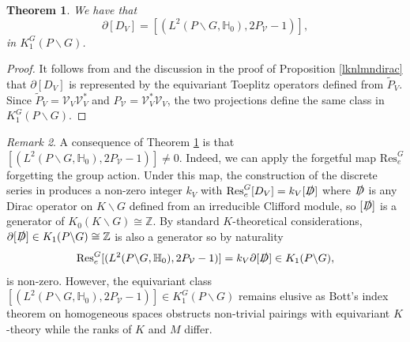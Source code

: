 \documentclass[a4paper,reqno]{amsart}
\numberwithin{equation}{section}
\def\Z{\mathbb{Z}}
\newtheorem{thm}{Theorem}[section]
\theoremstyle{definition}
\theoremstyle{remark}
\newtheorem{remark}[thm]{Remark}
\begin{document}
\begin{thm}
\label{lknlnadkhom}
We have that
$$\partial[D_V]=[(L^2(P\backslash G,\mathbb{H}_0),2P_{\mathcal{V}}-1)],$$
in $K_1^{G}(P\backslash G)$.
\end{thm}

\begin{proof}
It follows from \cite[Subsection 3.4]{fries} and the discussion in the proof of Proposition \ref{lknlmndirac} that $\partial[D_V]$ is represented by the equivariant Toeplitz operators defined from $\tilde{P}_V$. Since $\tilde{P}_V=\mathcal{V}_V\mathcal{V}_V^*$ and $P_{\mathcal{V}}=\mathcal{V}_V^*\mathcal{V}_V$, the two projections define the same class in $K_1^{G}(P\backslash G)$.
\end{proof}



\begin{remark}
A consequence of Theorem \ref{lknlnadkhom} is that $[(L^2(P\backslash G,\mathbb{H}_0),2P_{\mathcal{V}}-1)]\neq 0$. Indeed, we can apply the forgetful map $\mathrm{Res}^G_e$ forgetting the group action. Under this map, the construction of the discrete series in \cite{laffaicm} produces a non-zero integer $k_V$ with $\mathrm{Res}^G_e[D_V]=k_V[\slashed{D}]$ where $\slashed{D}$ is any Dirac operator on $K\backslash G$ defined from an irreducible Clifford module, so $[\slashed{D}]$ is a generator of $K_0(K\backslash G)\cong \Z$. By standard $K$-theoretical considerations, $\partial[\slashed{D}]\in K_1(P\backslash G)\cong \Z$ is also a generator so by naturality 
$$\mathrm{Res}^G_e[(L^2(P\backslash G,\mathbb{H}_0),2P_{\mathcal{V}}-1)]=k_V\partial [\slashed{D}]\in K_1(P\backslash G),$$ 
is non-zero. However, the equivariant class $[(L^2(P\backslash G,\mathbb{H}_0),2P_{\mathcal{V}}-1)]\in K_1^{G}(P\backslash G)$ remains elusive as Bott's index theorem on homogeneous spaces \cite{botthomo} obstructs non-trivial pairings with equivariant $K$-theory while the ranks of $K$ and $M$ differ.
\end{remark}
\end{document}

